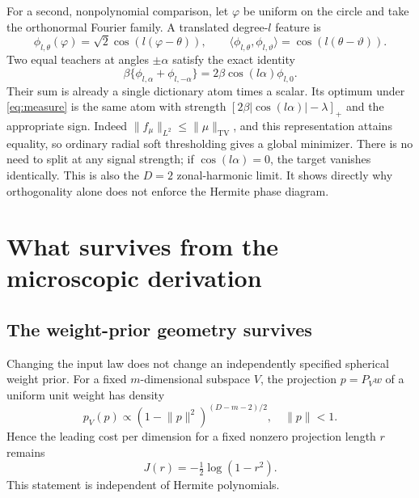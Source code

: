 \documentclass[11pt]{article}
\newcommand{\ip}[2]{\langle #1,#2\rangle}
\newcommand{\norm}[1]{\lVert #1\rVert}
\newcommand{\TV}{\mathrm{TV}}
\theoremstyle{remark}
\begin{document}
For a second, nonpolynomial comparison, let $\varphi$ be uniform on the
circle and take the orthonormal Fourier family. A translated degree-$l$
feature is
\begin{equation}
 \phi_{l,\theta}(\varphi)=\sqrt2\cos(l(\varphi-\theta)),\qquad
 \ip{\phi_{l,\theta}}{\phi_{l,\vartheta}}=\cos(l(\theta-\vartheta)).
\end{equation}
Two equal teachers at angles $\pm\alpha$ satisfy the exact identity
\begin{equation}
 \beta\{\phi_{l,\alpha}+\phi_{l,-\alpha}\}
       =2\beta\cos(l\alpha)\phi_{l,0}.
\end{equation}
Their sum is already a single dictionary atom times a scalar. Its optimum
under \eqref{eq:measure} is the same atom with strength
$[2\beta|\cos(l\alpha)|-\lambda]_+$ and the appropriate sign.
Indeed $\norm{f_\mu}_{L^2}\leq\norm\mu_\TV$, and this representation
attains equality, so ordinary radial soft thresholding gives a global
minimizer. There is no need to split at any signal strength; if
$\cos(l\alpha)=0$, the target vanishes identically. This is also the
$D=2$ zonal-harmonic limit. It shows directly why orthogonality alone
does not enforce the Hermite phase diagram.

\section{What survives from the microscopic derivation}\label{sec:micro}

\subsection{The weight-prior geometry survives}
Changing the input law does not change an independently specified spherical
weight prior. For a fixed $m$-dimensional subspace $V$, the projection
$p=P_Vw$ of a uniform unit weight has density
\begin{equation}
 p_V(p)\propto(1-\norm p^2)^{(D-m-2)/2},\quad \norm p<1.
\end{equation}
Hence the leading cost per dimension for a fixed nonzero projection
length $r$ remains
\begin{equation}
 J(r)=-\tfrac12\log(1-r^2).
\end{equation}
This statement is independent of Hermite polynomials.
\end{document}
